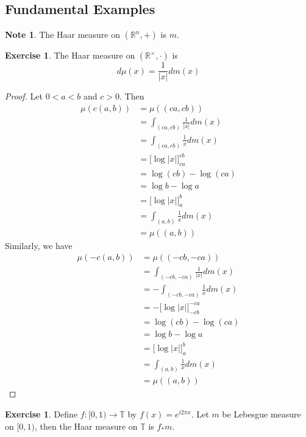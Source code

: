 \documentclass[12pt]{amsart}
\theoremstyle{definition}
\newtheorem{note}[definition]{Note}
\newtheorem{ex}[definition]{Exercise}
\newcommand{\R}{\mathbb{R}}
\newcommand{\T}{\mathbb{T}}
\begin{document}
	\subsection{Fundamental Examples}		
	
	\begin{note}
		The Haar measure on  $(\R^n, +)$ is $m$.
	\end{note}
	
	\begin{ex}
		The Haar measure on $(\R^{\times}, \cdot)$  is $$d\mu(x) = \frac{1}{|x|} dm(x)$$
	\end{ex}

	\begin{proof}
		Let $0 < a < b$ and $c >0$. Then
		\begin{align*}
			\mu(c(a, b))
			& = \mu((ca,cb)) \\
			& = \int_{(ca,cb)} \frac{1}{|x|} dm(x)\\
			& = \int_{(ca,cb)} \frac{1}{x} dm(x)\\
			& = \bigg[ \log|x| \bigg]_{ca}^{cb} \\
			& = \log(cb) - \log(ca) \\
			& = \log b - \log a \\
			& = \bigg[ \log|x| \bigg]_{a}^{b} \\ 
			& =  \int_{(a,b)} \frac{1}{x} dm(x)\\
			& = \mu((a,b))
		\end{align*}
	Similarly, we have
	\begin{align*}
		\mu(-c(a, b))
		& = \mu((-cb,-ca)) \\
		& = \int_{(-cb,-ca)} \frac{1}{|x|} dm(x)\\
		& = - \int_{(-cb,-ca)} \frac{1}{x} dm(x)\\
		& = - \bigg[ \log|x| \bigg]_{-cb}^{-ca} \\
		& = \log(cb) - \log(ca) \\
		& = \log b - \log a \\
		& = \bigg[ \log|x| \bigg]_{a}^{b} \\ 
		& =  \int_{(a,b)} \frac{1}{x} dm(x)\\
		& = \mu((a,b))
	\end{align*}
	\end{proof}

	\begin{ex}
		Define $f: [ 0,1) \rightarrow \T$ by $f(x) = e^{i2 \pi x}$. Let $m$ be Lebesgue measure on $[0,1)$, then the Haar measure on $\T$ is $f_*m$.
	\end{ex}
\end{document}
